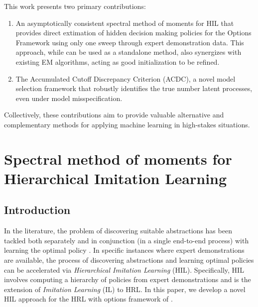 This work presents two primary contributions:
\begin{enumerate}
  \item An asymptotically consistent spectral method of moments for HIL that provides direct extimation of hidden decision making policies 
    for the Options Framework \citep{SUTTON1999181} using only one sweep through expert demonstration data. 
    This approach, while can be used as a standalone method, also synergizes with existing EM algorithms, acting as 
    good initialization to be refined.
  \item The Accumulated Cutoff Discrepancy Criterion (ACDC), a novel model selection framework that robustly identifies the true number latent processes, even under model misspecification.
\end{enumerate}
Collectively, these contributions aim to provide valuable alternative and complementary methods for applying machine learning in high-stakes situations.
 
\chapter{Spectral method of moments for Hierarchical Imitation Learning}
\section{Introduction}
\label{sec:introduction}
In the literature, the problem of discovering suitable abstractions has been tackled both separately and in conjunction (in a single end-to-end process) with learning the optimal policy \citep{Barto2003}.
In specific instances where expert demonstrations are available, the process of discovering abstractions and learning optimal policies can be accelerated via \emph{Hierarchical Imitation Learning} (HIL).
Specifically, HIL involves computing a hierarchy of policies from expert demonstrations and is the extension of \emph{Imitation Learning} (IL) to HRL.
In this paper, we develop a novel HIL approach for the HRL with options framework of \citet{SUTTON1999181}.

